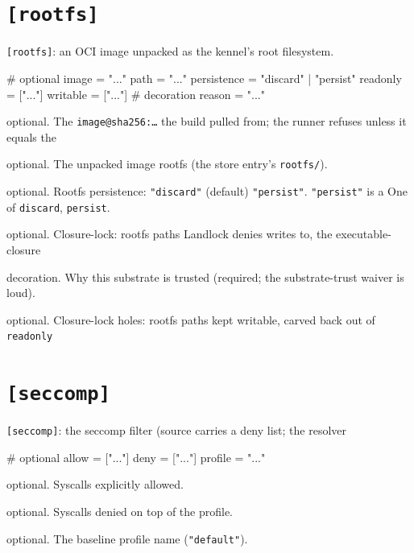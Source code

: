 \hypertarget{rootfs}{%
\section{\texorpdfstring{\texttt{{[}rootfs{]}}}{{[}rootfs{]}}}\label{rootfs}}

\texttt{{[}rootfs{]}}: an OCI image unpacked as the kennel's root
filesystem.

\begin{kennelcode}
[rootfs]
# optional
image    = "..."
path     = "..."
persistence = "discard" | "persist"
readonly = ["..."]
writable = ["..."]
# decoration
reason   = "..."
\end{kennelcode}

\begin{description}
\tightlist
\item[\texttt{image}]
optional. The \texttt{image@sha256:…} the build pulled from; the runner
refuses unless it equals the
\item[\texttt{path}]
optional. The unpacked image rootfs (the store entry's
\texttt{rootfs/}).
\item[\texttt{persistence}]
optional. Rootfs persistence: \texttt{"discard"} (default) \textbar{}
\texttt{"persist"}. \texttt{"persist"} is a One of \texttt{discard},
\texttt{persist}.
\item[\texttt{readonly}]
optional. Closure-lock: rootfs paths Landlock denies writes to, the
executable-closure
\item[\texttt{reason}]
decoration. Why this substrate is trusted (required; the substrate-trust
waiver is loud).
\item[\texttt{writable}]
optional. Closure-lock holes: rootfs paths kept writable, carved back
out of \texttt{readonly}
\end{description}

\hypertarget{seccomp}{%
\section{\texorpdfstring{\texttt{{[}seccomp{]}}}{{[}seccomp{]}}}\label{seccomp}}

\texttt{{[}seccomp{]}}: the seccomp filter (source carries a deny list;
the resolver

\begin{kennelcode}
[seccomp]
# optional
allow    = ["..."]
deny     = ["..."]
profile  = "..."
\end{kennelcode}

\begin{description}
\tightlist
\item[\texttt{allow}]
optional. Syscalls explicitly allowed.
\item[\texttt{deny}]
optional. Syscalls denied on top of the profile.
\item[\texttt{profile}]
optional. The baseline profile name (\texttt{"default"}).
\end{description}

